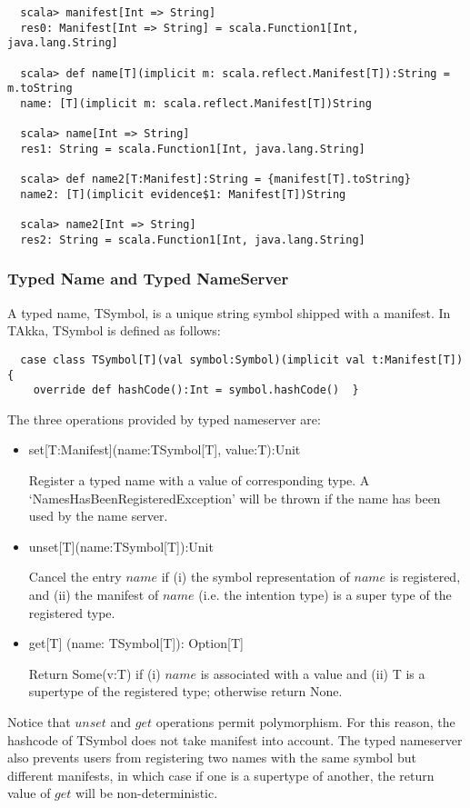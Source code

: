 \begin{lstlisting}
  scala> manifest[Int => String]
  res0: Manifest[Int => String] = scala.Function1[Int, java.lang.String]

  scala> def name[T](implicit m: scala.reflect.Manifest[T]):String = m.toString
  name: [T](implicit m: scala.reflect.Manifest[T])String

  scala> name[Int => String]
  res1: String = scala.Function1[Int, java.lang.String]

  scala> def name2[T:Manifest]:String = {manifest[T].toString}
  name2: [T](implicit evidence$1: Manifest[T])String

  scala> name2[Int => String]
  res2: String = scala.Function1[Int, java.lang.String]
\end{lstlisting}

\subsubsection{Typed Name and Typed NameServer}
A typed name, TSymbol, is a unique string symbol shipped with a manifest.  In TAkka, TSymbol is defined as follows:

\begin{lstlisting}
  case class TSymbol[T](val symbol:Symbol)(implicit val t:Manifest[T]) {
    override def hashCode():Int = symbol.hashCode()  }
\end{lstlisting}

The three operations provided by typed nameserver are:
\begin{itemize}
  \item set[T:Manifest](name:TSymbol[T], value:T):Unit

Register a typed name with a value of corresponding type.  A \lq{}NamesHasBeenRegisteredException\rq{} will be thrown if the name has been used by the name server.

  \item unset[T](name:TSymbol[T]):Unit

Cancel the entry $name$ if (i)  the symbol representation of $name$ is registered, and (ii) the manifest of $name$ (i.e. the intention type) is a super type of the registered type.

  \item get[T] (name: TSymbol[T]): Option[T]

Return Some(v:T) if (i) $name$ is associated with a value and (ii) T is a supertype of the registered type; otherwise return None.
\end{itemize}

Notice that $unset$ and $get$ operations permit polymorphism.  For this reason, the hashcode of TSymbol does not take manifest into account.  The typed nameserver also prevents users from registering two names with the same symbol but different manifests, in which case if one is a supertype of another, the return value of $get$ will be non-deterministic.



